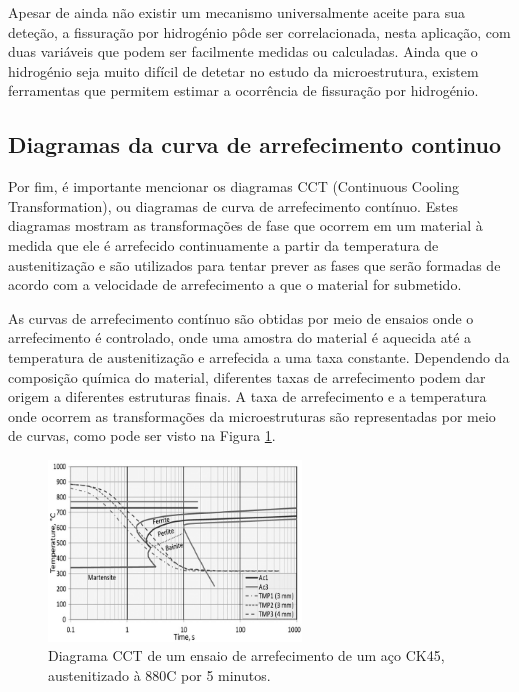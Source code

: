 \par
Apesar de ainda não existir um mecanismo universalmente aceite para sua deteção, a fissuração por hidrogénio pôde ser correlacionada, nesta aplicação, com duas variáveis que podem ser facilmente medidas ou calculadas. Ainda que o hidrogénio seja muito difícil de detetar no estudo da microestrutura, existem ferramentas que permitem estimar a ocorrência de fissuração por hidrogénio.
\subsection{Diagramas da curva de arrefecimento continuo}\label{ssec:diagramas_CCT}
Por fim, é importante mencionar os diagramas CCT (Continuous Cooling Transformation), ou diagramas de curva de arrefecimento contínuo. Estes diagramas mostram as transformações de fase que ocorrem em um material à medida que ele é arrefecido continuamente a partir da temperatura de austenitização e são utilizados para tentar prever as fases que serão formadas de acordo com a velocidade de arrefecimento a que o material for submetido.
\par
As curvas de arrefecimento contínuo são obtidas por meio de ensaios onde o arrefecimento é controlado, onde uma amostra do material é aquecida até a temperatura de austenitização e arrefecida a uma taxa constante. Dependendo da composição química do material, diferentes taxas de arrefecimento podem dar origem a diferentes estruturas finais. A taxa de arrefecimento e a temperatura onde ocorrem as transformações da microestruturas são representadas por meio de curvas, como pode ser visto na Figura \ref{fig:CCT_SOA}.
\begin{figure}[htb]
    \centering
    \includegraphics[width = 0.6\textwidth]{Figures/Cap2/CCT_SOA.png}
    \caption[Diagrama CCT de um aço CK45]%
    {Diagrama CCT de um ensaio de arrefecimento de um aço CK45, austenitizado à 880\textdegree C por 5 minutos\cite{Karli2016}.}
    \label{fig:CCT_SOA}
\end{figure}
